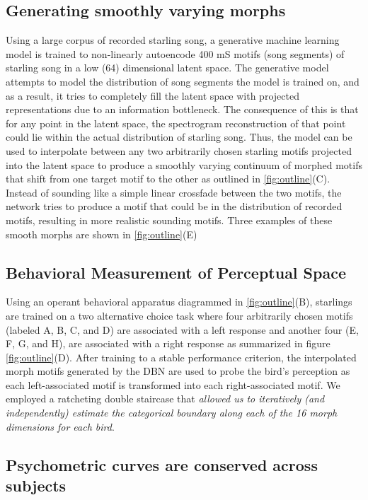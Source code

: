 

\subsection{Generating smoothly varying morphs}

Using a large corpus of recorded starling song, a generative machine learning model is trained to non-linearly autoencode 400 mS motifs (song segments) of starling song in a low (64) dimensional latent space. The generative model attempts to model the distribution of song segments the model is trained on, and as a result, it tries to completely fill the latent space with projected representations due to an information bottleneck. The consequence of this is that for any point in the latent space, the spectrogram reconstruction of that point could lie within the actual distribution of starling song. Thus, the model can be used to interpolate between any two arbitrarily chosen starling motifs projected into the latent space to produce a smoothly varying continuum of morphed motifs that shift from one target motif to the other as outlined in \ref{fig:outline}(C). Instead of sounding like a simple linear crossfade between the two motifs, the network tries to produce a motif that could be in the distribution of recorded motifs, resulting in more realistic sounding motifs. Three examples of these smooth morphs are shown in \ref{fig:outline}(E) 

\subsection{Behavioral Measurement of Perceptual Space}

Using an operant behavioral apparatus diagrammed in \ref{fig:outline}(B), starlings are trained on a two alternative choice task where four arbitrarily chosen motifs (labeled A, B, C, and D) are associated with a left response and another four (E, F, G, and H), are associated with a right response as summarized in figure \ref{fig:outline}(D). After training to a stable performance criterion, the interpolated morph motifs generated by the \ac{DBN} are used to probe the bird's perception as each left-associated motif is transformed into each right-associated motif. We employed a ratcheting double staircase that \emph{allowed us to iteratively (and independently) estimate the categorical boundary along each of the 16 morph dimensions for each bird}. 

\subsection{Psychometric curves are conserved across subjects}

